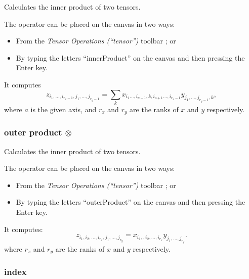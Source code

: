 
\label{Operation:innerProduct} Calculates the inner product of two
tensors.

The operator can be placed on the canvas in two ways:
\begin{itemize}
\item From the \emph{Tensor Operations (``tensor'')} toolbar ;
or 
\item By typing the letters ``innerProduct'' on the canvas and then pressing
the Enter key.
\end{itemize}
It computes 
\[
z_{i_{1},\ldots,i_{r_{x}-1},j_{1},\ldots,j_{r_{y}-1}}=\sum_{k}x_{i_{1}\ldots,i_{a-1},k,i_{a+1}\ldots,i_{r_{x}-1}}y_{j_{1},\ldots,j_{r_{y}-1},k},
\]
where $a$ is the given axis, and $r_{x}$ and $r_{y}$ are the ranks
of $x$ and $y$ respectively.

\subsubsection{outer product $\otimes$}


\label{Operation:outerProduct} Calculates the inner product of two
tensors.

The operator can be placed on the canvas in two ways:
\begin{itemize}
\item From the \emph{Tensor Operations (``tensor'')} toolbar ;
or 
\item By typing the letters ``outerProduct'' on the canvas and then pressing
the Enter key.
\end{itemize}
It computes: 
\[
z_{i_{1},i_{2},\ldots,i_{r_{x}},j_{1},\ldots,j_{r_{y}}}=x_{i_{1},,i_{2},\ldots,i_{r_{x}}}y_{j_{1},\ldots,j_{r_{y}}}.
\]
where $r_{x}$ and $r_{y}$ are the ranks of $x$ and $y$ respectively.

\subsubsection{index}

\label{Operation:index}



